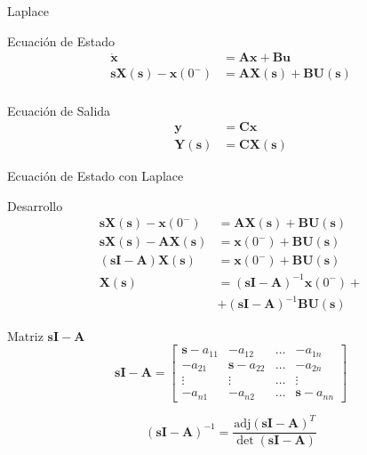 \documentclass[xcolor={usenames,svgnames,dvipsnames}]{beamer}
\newcommand{\laplace}[1]{\mathbf{#1}(\mathbf{s})}
\newcommand{\slp}{\mathbf{s}}
\begin{document}
\begin{frame}[label={sec:orgecedebc}]{Laplace}
\begin{block}{Ecuación de Estado}
\begin{align*}
  \dot{\mathbf{x}} &= \mathbf{A}\mathbf{x} + \mathbf{B}\mathbf{u}\\
  \slp \laplace{X} - \mathbf{x}(0^-) &= \mathbf{A}\laplace{X} + \mathbf{B}\laplace{U}\\
\end{align*}
\end{block}
\begin{block}{Ecuación de Salida}
\begin{align*}
  \mathbf{y} &= \mathbf{C}\mathbf{x}\\
  \laplace{Y} &= \mathbf{C}\laplace{X}
\end{align*}
\end{block}
\end{frame}
\begin{frame}[label={sec:orga994ed8}]{Ecuación de Estado con Laplace}
\begin{block}{Desarrollo}
\begin{align*}
  \slp \laplace{X} - \mathbf{x}(0^-) &= \mathbf{A}\laplace{X} + \mathbf{B}\laplace{U}\\
  \slp \laplace{X} - \mathbf{A}\laplace{X} &= \mathbf{x}(0^-) + \mathbf{B}\laplace{U}\\
  \left(\slp \mathbf{I} - \mathbf{A} \right) \laplace{X} &= \mathbf{x}(0^-) + \mathbf{B}\laplace{U}\\
  \laplace{X} &= \left(\slp \mathbf{I} - \mathbf{A} \right)^{-1} \mathbf{x}(0^-) +\\ 
  &+ \left(\slp \mathbf{I} - \mathbf{A} \right)^{-1} \mathbf{B}\laplace{U}
\end{align*}
\end{block}
\end{frame}

\begin{frame}[label={sec:org7b05701}]{Matriz \(\slp \mathbf{I} - \mathbf{A}\)}
\[
\slp \mathbf{I} - \mathbf{A} = 
\begin{bmatrix} 
\slp - a_{11} & -a_{12} & \dots & -a_{1n}\\
- a_{21} & \slp -a_{22} & \dots & -a_{2n}\\
\vdots & \vdots & \dots & \vdots \\
- a_{n1} & -a_{n2} & \dots & \slp - a_{nn}
\end{bmatrix}
\]

\[
\left(\slp \mathbf{I} - \mathbf{A} \right)^{-1} = \frac{\text{adj}(\slp \mathbf{I} - \mathbf{A})^T}{\det(\slp \mathbf{I} - \mathbf{A})}
\]
\end{frame}
\end{document}
